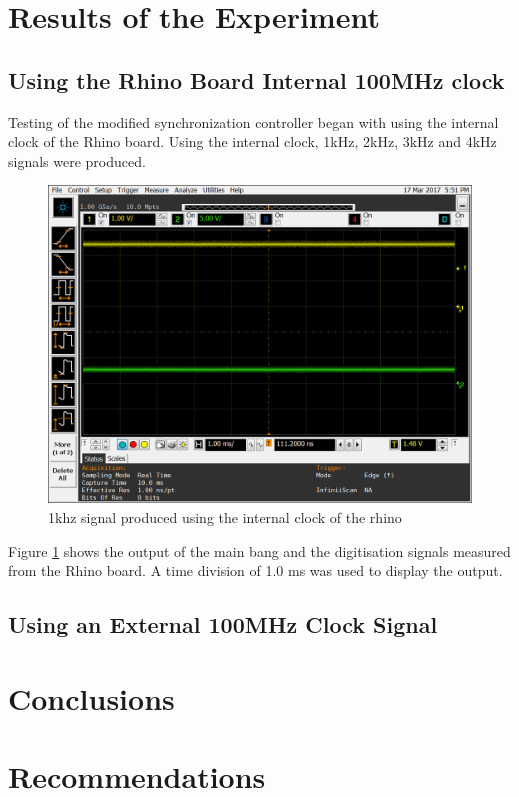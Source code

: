 \documentclass[12pt, a4paper, twoside]{article}
\begin{document}
	
\section{Results of the Experiment}

\subsection{Using the Rhino Board Internal 100MHz clock}

Testing of the modified synchronization controller began with using the internal clock of the Rhino board. Using the internal clock, 1kHz, 2kHz, 3kHz and 4kHz signals were produced. 

	\begin{figure}[h]
		\centering
		\includegraphics[width=13cm]{1khz_mb_offset_500_ns}
		\caption{1khz signal produced using the internal clock of the rhino}
		\label{fig:1khz_in_500_offset}
	\end{figure}
	
Figure \ref{fig:1khz_in_500_offset} shows the output of the main bang and the digitisation signals measured from the Rhino board. A time division of 1.0 ms was used to display the output.

\subsection{Using an External 100MHz Clock Signal}


\section{Conclusions}

\section{Recommendations}
\end{document}
